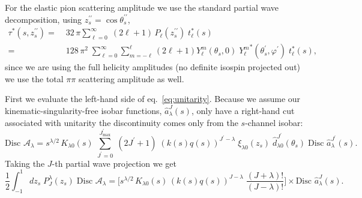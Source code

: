 \documentclass[10pt, aps,prd,amsmath,amssymb,superscriptaddress,onecolumn,
nofootinbib,showpacs,preprintnumbers]{revtex4-1}
\newcommand{\jpmax}{{J^\prime_\text{max}}}
\newcommand{\Disc}{\text{Disc }}
\begin{document}
For the elastic pion scattering amplitude we use the standard partial wave decomposition, using \( z_s^{\prime\prime} = \cos \theta_s^{\prime\prime}\),
  \begin{align}
    \label{eq:elastic-pion}
    \tau^*(s, z_s^{\prime\prime}) =& \; 32 \, \pi \sum_{\ell=0  }^\infty \; (2\ell+1) \, P_{\ell}(z_s^{\prime\prime}) \; t_\ell^*(s) \nonumber \\
    =& \; 128 \, \pi^2 \; \sum_{\ell=0}^\infty \sum_{m=-\ell}^{\ell} (2\ell +1 ) Y^m_\ell(\theta_s,0) \; {Y^m_\ell}^*(\theta_s^\prime, \varphi^\prime) \; t_\ell^*(s),
  \end{align}
since we are using the full helicity amplitudes (no definite isospin projected out) we use the total \(\pi\pi\) scattering amplitude as well.

First we evaluate the left-hand side of eq.~\ref{eq:unitarity}. Because we assume our kinematic-singularity-free isobar functions, \(\hat{a}_\lambda^J(s)\), only have a right-hand cut associated with unitarity the discontinuity comes only from the \(s\)-channel isobar:
  \begin{equation}
    \label{eq:discontinuity}
    \Disc \mathcal{A}_\lambda = s^{\lambda/2}\, K_{\lambda 0}(s) \; \sum_{J^\prime=0}^\jpmax \; (2 J^\prime +1) \; (k(s)q(s))^{J^\prime-\lambda}  \; \xi_{\lambda 0}(z_s)
    \; \hat{d}^{J^\prime}_{\lambda 0}(\theta_s) \; \Disc \hat{a}_\lambda^{J^\prime}(s).
  \end{equation}
Taking the \(J\)-th partial wave projection we get
  \begin{equation}
    \label{eq:pw-disc}
    \frac{1}{2} \int_{-1}^1 dz_s \; P^\lambda_{J}(z_s) \; \Disc \mathcal{A}_\lambda =
    \bigg[ s^{\lambda/2} \, K_{\lambda 0}(s) \, (k(s)q(s))^{J-\lambda} \; \frac{(J+\lambda)!}{(J-
    \lambda)!} \bigg] \times \Disc \hat{a}^J_\lambda(s).
  \end{equation}
\end{document}
